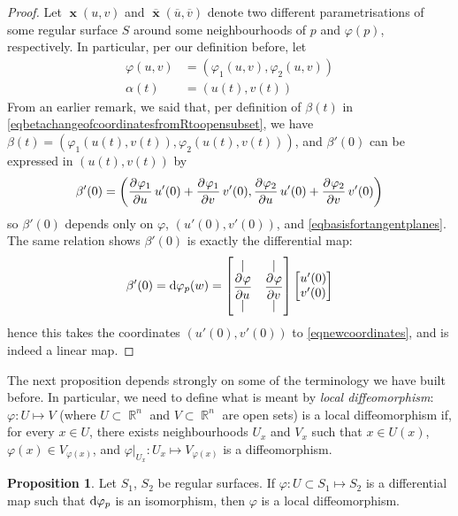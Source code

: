 \documentclass{amsart} %
\theoremstyle{mytheoremstyle}
\theoremstyle{definition}
\newtheorem{proposition}[definition]{Proposition}
\numberwithin{equation}{section}
\DeclareMathOperator{\R}{\mathbb{R}}
\DeclareMathOperator{\1}{\mathbbm{1}}
\DeclareMathOperator{\D}{\dif}
\DeclareMathOperator{\x}{\mathbf{x}}
\renewcommand{\phi}{\varphi}
\renewcommand{\phi}{\varphi}
\begin{document}
\begin{proof}
	Let $\x(u,v)$ and $\overline{\x}(\overline{u},\overline{v})$ denote two different parametrisations of some regular surface $S$ around some neighbourhoods of $p$ and $\phi(p)$, respectively. In particular, per our definition before, let
	\begin{align*}
		\phi(u,v) &= (\phi_1(u,v),\phi_2(u,v)) \\
		\alpha(t) &= (u(t),v(t))
	\end{align*}
	From an earlier remark, we said that, per definition of $\beta(t)$ in \eqref{eqbetachangeofcoordinatesfromRtoopensubset}, we have $\beta(t) = (\phi_1(u(t),v(t)),\phi_2(u(t),v(t)))$, and $\beta'(0)$ can be expressed in $(u(t),v(t))$ by
	\begin{align}
	\label{eqnewcoordinates}
	\beta'(0) = \left( \dpd{\phi_1}{u} u'(0) + \dpd{\phi_1}{v} v'(0) , \dpd{\phi_2}{u} u'(0) + \dpd{\phi_2}{v} v'(0)  \right)
	\end{align}
	so $\beta'(0)$ depends only on $\phi$, $(u'(0),v'(0))$, and \eqref{eqbasisfortangentplanes}. The same relation shows $\beta'(0)$ is exactly the differential map:
	\begin{align*}
		\beta'(0) = \D \phi_p (w) = \begin{bmatrix*}[c]
			\vert & \vert \\ \dpd{\phi}{u} & \dpd{\phi}{v} \\ \vert & \vert
		\end{bmatrix*} \begin{bmatrix*}[c]
			u'(0) \\ v'(0)
		\end{bmatrix*}
	\end{align*}
	hence this takes the coordinates $(u'(0),v'(0))$ to \eqref{eqnewcoordinates}, and is indeed a linear map.
\end{proof}

\noindent The next proposition depends strongly on some of the terminology we have built before. In particular, we need to define what is meant by \textit{local diffeomorphism}: $\phi: U \mapsto V$ (where $U \subset \R^n$ and $V \subset \R^n$ are open sets) is a local diffeomorphism if, for every $x \in U$, there exists neighbourhoods $U_x$ and $V_x$ such that $x \in U(x)$, $\phi(x) \in V_{\phi(x)}$, and $\phi|_{U_x} : U_x \mapsto V_{\phi(x)}$ is a diffeomorphism.

\begin{proposition}
	\label{propdifferentialisisomorphismimpliesmapislocaldiffeomorphism}
	Let $S_1$, $S_2$ be regular surfaces. If $\phi: U \subset S_1 \mapsto S_2$ is a differential map such that $\D \phi_p$ is an isomorphism, then $\phi$ is a local diffeomorphism.
\end{proposition}
\end{document}
